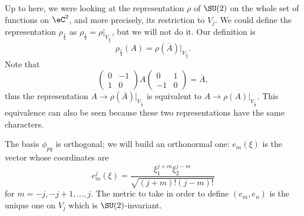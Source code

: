 Up to here, we were looking at the representation $\rho$ of $\SU(2)$ on the whole set of functions on $\eC^2$, and more precisely, its restriction to $V_j$. We could define the representation $\rho_{\frac{1}{2}}$ as $\rho_{\frac{1}{2}}=\rho|_{V_{\frac{1}{2}}}$, but we will not do it. Our definition is
\begin{equation}
  \rho_{\frac{1}{2}}(A)=\rho(\overline{A})|_{V_{\frac{1}{2}}}.
\end{equation}
Note that
\[
\begin{pmatrix}
0 & -1 \\
1 & 0
\end{pmatrix}
A
\begin{pmatrix}
0 & 1 \\
-1 & 0
\end{pmatrix}=\overline{A},
\]
thus the representation $A\to\rho(\overline{A})|_{V_{\frac{1}{2}}}$ is equivalent to $A\to\rho(A)|_{V_{\frac{1}{2}}}$. This equivalence can also be seen because these two representations have the same characters\quextproj.

The basis $\phi_{pq}$ is orthogonal; we will build an orthonormal one: $e_m(\xi)$ is the vector whose coordinates are
\begin{equation}
e_m^j(\xi)=\frac{ \xi_1^{j+m}\xi_2^{j-m} }{\sqrt{ (j+m)!(j-m)! }}
\end{equation}
for $m=-j,-j+1,\ldots,j$. The metric to take in order to define $(e_m,e_n)$ is the unique one on $V_j$ which is $\SU(2)$-invariant.


